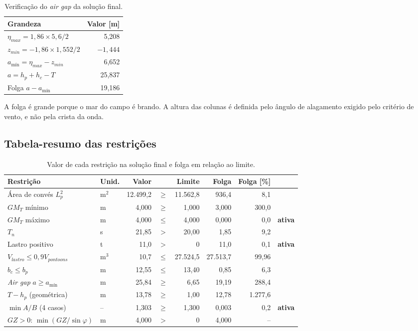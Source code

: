\documentclass[11pt,a4paper]{article}
\begin{document}
\begin{table}[H]
\centering
\caption{Verificação do \emph{air gap} da solução final.}\label{tab:airgap}
\begin{tabular}{lr}
\toprule
Grandeza & Valor [m] \\
\midrule
$\eta_{max} = 1{,}86 \times 5{,}6/2$ & 5,208 \\
$z_{min} = -1{,}86 \times 1{,}552/2$ & $-1{,}444$ \\
$a_{\text{mín}} = \eta_{max} - z_{min}$ & 6,652 \\
$a = h_p + h_c - T$ & 25,837 \\
Folga $a - a_{\text{mín}}$ & 19,186 \\
\bottomrule
\end{tabular}
\end{table}

A folga é grande porque o mar do campo é brando. A altura das colunas é definida pelo
ângulo de alagamento exigido pelo critério de vento, e não pela crista da onda.

\subsection{Tabela-resumo das restrições}

\begin{table}[H]
\centering
\caption{Valor de cada restrição na solução final e folga em relação ao limite.}\label{tab:resumo}
\small
\begin{tabular}{llrcrrrl}
\toprule
Restrição & Unid. & Valor & & Limite & Folga & Folga [\%] & \\
\midrule
Área de convés $L_p^2$ & m$^2$ & 12.499,2 & $\ge$ & 11.562,8 & 936,4 & 8,1 & \\
$GM_T$ mínimo & m & 4,000 & $\ge$ & 1,000 & 3,000 & 300,0 & \\
$GM_T$ máximo & m & 4,000 & $\le$ & 4,000 & 0,000 & 0,0 & \textbf{ativa} \\
$T_n$ & s & 21,85 & $>$ & 20,00 & 1,85 & 9,2 & \\
Lastro positivo & t & 11,0 & $>$ & 0 & 11,0 & 0,1 & \textbf{ativa} \\
$V_{lastro} \le 0{,}9 V_{pontoons}$ & m$^3$ & 10,7 & $\le$ & 27.524,5 & 27.513,7 & 99,96 & \\
$b_c \le b_p$ & m & 12,55 & $\le$ & 13,40 & 0,85 & 6,3 & \\
\emph{Air gap} $a \ge a_{\text{mín}}$ & m & 25,84 & $\ge$ & 6,65 & 19,19 & 288,4 & \\
$T - h_p$ (geométrica) & m & 13,78 & $\ge$ & 1,00 & 12,78 & 1.277,6 & \\
$\min A/B$ (4 casos) & -- & 1,303 & $\ge$ & 1,300 & 0,003 & 0,2 & \textbf{ativa} \\
$GZ > 0$: $\min(GZ/\sin\varphi)$ & m & 4,000 & $>$ & 0 & 4,000 & -- & \\
\bottomrule
\end{tabular}
\end{table}
\end{document}
